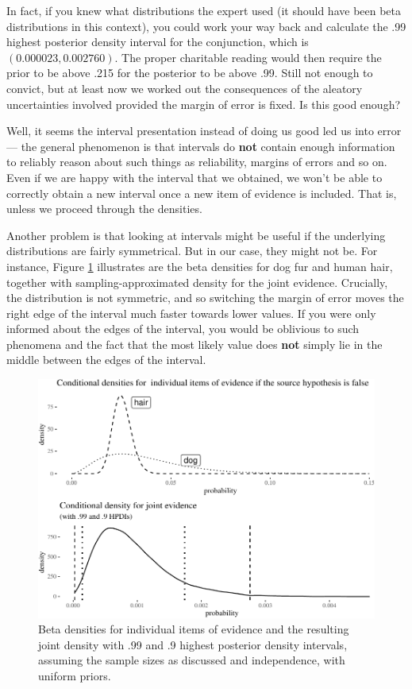 \documentclass[
  10pt,
  dvipsnames,enabledeprecatedfontcommands]{scrartcl}
\begin{document}
In fact, if you knew what distributions the expert used (it should have
been beta distributions in this context), you could work your way back
and calculate the .99 highest posterior density interval for the
conjunction, which is \((0.000023, 0.002760)\). The proper charitable
reading would then require the prior to be above .215 for the posterior
to be above .99. Still not enough to convict, but at least now we worked
out the consequences of the aleatory uncertainties involved provided the
margin of error is fixed. Is this good enough?

Well, it seems the interval presentation instead of doing us good led us
into error --- the general phenomenon is that intervals do \textbf{not}
contain enough information to reliably reason about such things as
reliability, margins of errors and so on. Even if we are happy with the
interval that we obtained, we won't be able to correctly obtain a new
interval once a new item of evidence is included. That is, unless we
proceed through the densities.

Another problem is that looking at intervals might be useful if the
underlying distributions are fairly symmetrical. But in our case, they
might not be. For instance, Figure \ref{fig:densities} illustrates are
the beta densities for dog fur and human hair, together with
sampling-approximated density for the joint evidence. Crucially, the
distribution is not symmetric, and so switching the margin of error
moves the right edge of the interval much faster towards lower values.
If you were only informed about the edges of the interval, you would be
oblivious to such phenomena and the fact that the most likely value does
\textbf{not} simply lie in the middle between the edges of the interval.

\begin{figure}[H]


\begin{center}\includegraphics[width=0.8\linewidth]{chapter-outline_files/figure-latex/fig:densities-1} \end{center}

\caption{Beta densities for individual items of evidence and the resulting joint density with .99 and .9 highest posterior density intervals, assuming the sample sizes as discussed and independence, with uniform priors.}

\label{fig:densities}

\end{figure}
\end{document}
